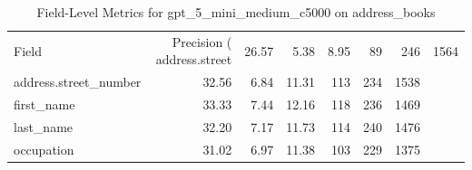 \begin{table}
\caption{Field-Level Metrics for gpt_5_mini_medium_c5000 on address_books}
\label{tab:fields_gpt_5_mini_medium_c5000_address_books}
\begin{tabular}{lrrrrrr}
\toprule
Field & Precision (%
\midrule
address.street & 26.57 & 5.38 & 8.95 & 89 & 246 & 1564 \\
address.street_number & 32.56 & 6.84 & 11.31 & 113 & 234 & 1538 \\
first_name & 33.33 & 7.44 & 12.16 & 118 & 236 & 1469 \\
last_name & 32.20 & 7.17 & 11.73 & 114 & 240 & 1476 \\
occupation & 31.02 & 6.97 & 11.38 & 103 & 229 & 1375 \\
\bottomrule
\end{tabular}
\end{table}
